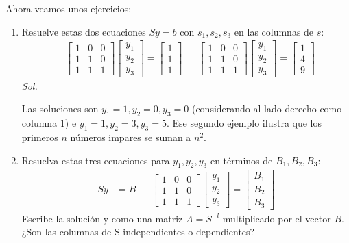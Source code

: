 Ahora veamos unos ejercicios:
\begin{enumerate}
	\item Resuelve estas dos ecuaciones $Sy=b$ con $s_{1}, s_2 , s_{3}$ en las columnas de $s$:
	      \begin{align*}
		       & \begin{bmatrix} 1 & 0 &0 \\ 1 & 1 &0 \\ 1 & 1 & 1 \end{bmatrix}\begin{bmatrix} y_{1}\\ y_2 \\ y_3 \end{bmatrix} = \begin{bmatrix} 1\\ 1\\ 1 \end{bmatrix} &  & \begin{bmatrix} 1 & 0 &0 \\ 1 & 1 &0 \\ 1 & 1 & 1 \end{bmatrix}\begin{bmatrix} y_{1}\\ y_2 \\ y_3 \end{bmatrix} = \begin{bmatrix} 1\\4\\ 9 \end{bmatrix}
	      \end{align*}
	      \textit{ Sol. }

	      Las soluciones son $y_1= 1, y_2= 0, y_3 = 0$ (considerando al lado derecho como columna 1) e $y_1= 1, y_2= 3,
		      y_3 = 5$. Ese segundo ejemplo ilustra que los primeros $n$ números impares se suman a $n^2 $.

	\item Resuelva estas tres ecuaciones para $y_{1}, y_2 , y_{3}$ en términos de $B_{1}, B_2 , B_{3}$:
	      \begin{align*}
		      Sy & =B &  & \begin{bmatrix} 1 & 0 &0 \\ 1 & 1 &0 \\ 1 & 1 & 1 \end{bmatrix}\begin{bmatrix} y_{1}\\ y_2 \\ y_3 \end{bmatrix}= \begin{bmatrix} B_{1}\\ B_2 \\ B_3 \end{bmatrix}
	      \end{align*}
	      Escribe la solución y como una matriz $A = S^{-l}$ multiplicado por el vector $B$. ¿Son las columnas de S
	      independientes o dependientes?


\end{enumerate}
